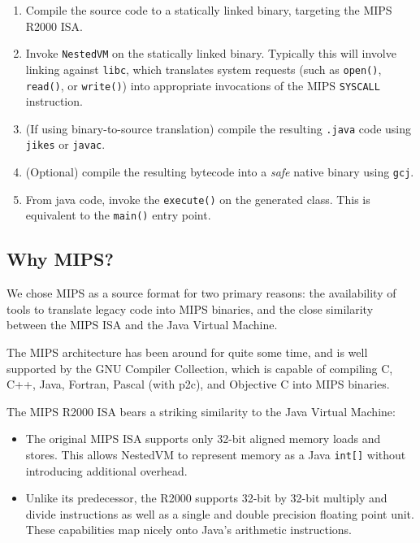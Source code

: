 \documentclass{acmconf}
\begin{document}
\begin{enumerate}

\item Compile the source code to a statically linked binary, targeting
      the MIPS R2000 ISA.

\item Invoke {\tt NestedVM} on the statically linked binary.
      Typically this will involve linking against {\tt libc}, which
      translates system requests (such as {\tt open()}, {\tt read()},
      or {\tt write()}) into appropriate invocations of the MIPS
      {\tt SYSCALL} instruction.

\item (If using binary-to-source translation) compile the resulting
      {\tt .java} code using {\tt jikes} or {\tt javac}.

\item (Optional) compile the resulting bytecode into a {\it safe}
      native binary using {\tt gcj}.

\item From java code, invoke the {\tt execute()} on the generated
      class.  This is equivalent to the {\tt main()} entry point.

\end{enumerate}


\subsection{Why MIPS?}

We chose MIPS as a source format for two primary reasons: the
availability of tools to translate legacy code into MIPS binaries, and
the close similarity between the MIPS ISA and the Java Virtual Machine.

The MIPS architecture has been around for quite some time, and is well
supported by the GNU Compiler Collection, which is capable of
compiling C, C++, Java, Fortran, Pascal (with p2c), and Objective C
into MIPS binaries.

The MIPS R2000 ISA bears a striking similarity to the Java Virtual
Machine:

\begin{itemize}

\item The original MIPS ISA supports only 32-bit aligned memory loads
      and stores.  This allows NestedVM to represent memory as a Java
      {\tt int[]} without introducing additional overhead.

\item Unlike its predecessor, the R2000 supports 32-bit by 32-bit
      multiply and divide instructions as well as a single and double
      precision floating point unit.  These capabilities map nicely
      onto Java's arithmetic instructions.

\end{itemize}
\end{document}
